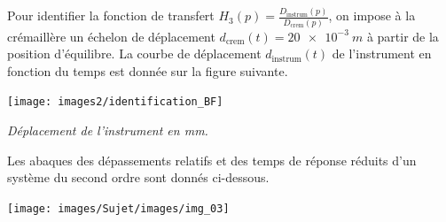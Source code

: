 \documentclass[10pt,fleqn]{article} %
\begin{document}
Pour identifier la fonction de transfert $H_3(p)=\frac{D_{\text{instrum}}(p)}{D_{\text{crem}}(p)}$, on impose à la crémaillère un échelon de déplacement $d_{\text{crem}}(t) = \SI{20e-3}{m}$ à partir de la position d'équilibre. La courbe de déplacement $d_{\text{instrum}}(t)$ de l'instrument en fonction du temps est donnée sur la figure suivante.


\begin{center}%
	\texttt{[image: images2/identification\_BF]}

	\textit{Déplacement de l'instrument en mm.}
\end{center}
Les abaques des dépassements relatifs et des temps de réponse réduits d’un système du second ordre sont donnés ci-dessous.



\begin{center}%
	\texttt{[image: images/Sujet/images/img\_03]}

\end{center}


%
%
%
\end{document}
